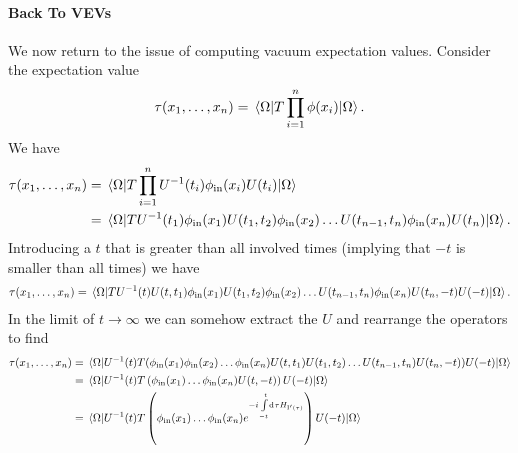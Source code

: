 \paragraph{Back To VEVs}
We now return to the issue of computing vacuum expectation values. Consider the expectation value
\begin{align*}
	\tau(x_{1}, \dots, x_{n}) = \expval{\ensuremath{T}\prod\limits_{i = 1}^{n}\phi(x_{i})}{\Omega}.
\end{align*}
We have
\begin{align*}
	\tau(x_{1}, \dots, x_{n}) &= \expval{\ensuremath{T}\prod\limits_{i = 1}^{n}U^{-1}(t_{i})\phi_{\text{in}}(x_{i})U(t_{i})}{\Omega} \\
	                          &= \expval{\ensuremath{T}U^{-1}(t_{1})\phi_{\text{in}}(x_{1})U(t_{1}, t_{2})\phi_{\text{in}}(x_{2})\dots U(t_{n - 1}, t_{n})\phi_{\text{in}}(x_{n})U(t_{n})}{\Omega}.
\end{align*}
Introducing a $t$ that is greater than all involved times (implying that $-t$ is smaller than all times) we have
\begin{align*}
	\tau(x_{1}, \dots, x_{n}) = \expval{\ensuremath{T}U^{-1}(t)U(t, t_{1})\phi_{\text{in}}(x_{1})U(t_{1}, t_{2})\phi_{\text{in}}(x_{2})\dots U(t_{n - 1}, t_{n})\phi_{\text{in}}(x_{n})U(t_{n}, -t)U(-t)}{\Omega}.
\end{align*}
In the limit of $t\to\infty$ we can somehow extract the $U$ and rearrange the operators to find
\begin{align*}
	\tau(x_{1}, \dots, x_{n}) &= \expval{U^{-1}(t)\ensuremath{T}(\phi_{\text{in}}(x_{1})\phi_{\text{in}}(x_{2})\dots \phi_{\text{in}}(x_{n})U(t, t_{1})U(t_{1}, t_{2})\dots U(t_{n - 1}, t_{n})U(t_{n}, -t))U(-t)}{\Omega} \\
	                          &= \expval{U^{-1}(t)\ensuremath{T}\left(\phi_{\text{in}}(x_{1})\dots \phi_{\text{in}}(x_{n})U(t, -t)\right)U(-t)}{\Omega} \\
	                          &= \expval{U^{-1}(t)\ensuremath{T}\left(\phi_{\text{in}}(x_{1})\dots \phi_{\text{in}}(x_{n})e^{-i\int\limits_{-t}^{t}\dd[]{\tau}H_{\text{I}\ensuremath{^{\prime}}(\tau)}}\right)U(-t)}{\Omega}
\end{align*}

